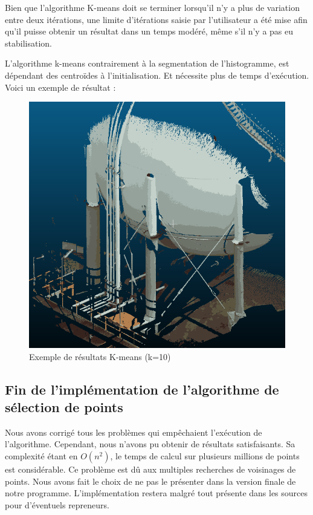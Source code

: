 \documentclass[12pt,titlepage,french]{article}
\begin{document}
Bien que l'algorithme K-means doit se terminer lorsqu'il n'y a plus de variation entre deux itérations,
une limite d'itérations saisie par l'utilisateur a été mise afin qu'il puisse obtenir un résultat dans un temps modéré, même s'il n'y a pas eu stabilisation.

L'algorithme k-means contrairement à la segmentation de l'histogramme, est dépendant des centroïdes à l'initialisation. Et nécessite plus de temps d'exécution.
Voici un exemple de résultat :

\begin{figure}[H]
 \caption{\label{} Exemple de résultats K-means (k=10)}
 \begin{center}
 \includegraphics[width=1\textwidth]{./img/kmeans_It.PNG}
  \end{center}
\end{figure}

\subsection{Fin de l'implémentation de l'algorithme de sélection de points}
Nous avons corrigé tous les problèmes qui empêchaient l'exécution de l'algorithme. Cependant, nous n'avons pu obtenir de résultats satisfaisants. Sa complexité étant en $O(n^{2})$, le temps de calcul sur plusieurs millions de points est considérable. Ce problème est dû aux multiples recherches de voisinages de points. Nous avons fait le choix de ne pas le présenter dans la version finale de notre programme. L'implémentation restera malgré tout présente dans les sources pour d'éventuels repreneurs. \newline
\end{document}
